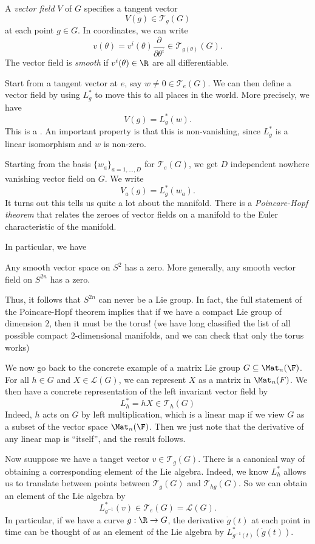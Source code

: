 \documentclass[a4paper]{article}
\begin{document}
\begin{defi}
  A \emph{vector field} $V$ of $G$ specifies a tangent vector
  \[
    V(g) \in \mathcal{T}_g(G)
  \]
  at each point $g \in G$. In coordinates, we can write
  \[
    v(\theta) = v^i (\theta) \frac{\partial}{\partial \theta^i} \in \mathcal{T}_{g(\theta)} (G).
  \]
  The vector field is \emph{smooth} if $v^i(\theta) \in \R$ are all differentiable.
\end{defi}

Start from a tangent vector at $e$, say $w\not= 0 \in \mathcal{T}_e(G)$. We can then define a vector field by using $L_g^*$ to move this to all places in the world. More precisely, we have
\[
  V(g) = L_g^*(w).
\]
This is a . An important property is that this is non-vanishing, since $L_g^*$ is a linear isomorphism and $w$ is non-zero.

Starting from the basis $\{w_a\}_{a = 1, \ldots, D}$ for $\mathcal{T}_e(G)$, we get $D$ independent nowhere vanishing vector field on $G$. We write
\[
  V_a(g) = L_g^* (w_a).
\]
It turns out this tells us quite a lot about the manifold. There is a \emph{Poincare-Hopf theorem} that relates the zeroes of vector fields on a manifold to the Euler characteristic of the manifold.

In particular, we have
\begin{thm}
  Any smooth vector space on $S^2$ has a zero. More generally, any smooth vector field on $S^{2n}$ has a zero.
\end{thm}
Thus, it follows that $S^{2n}$ can never be a Lie group. In fact, the full statement of the Poincare-Hopf theorem implies that if we have a compact Lie group of dimension $2$, then it must be the torus! (we have long classified the list of all possible compact 2-dimensional manifolds, and we can check that only the torus works)

We now go back to the concrete example of a matrix Lie group $G \subseteq \Mat_n(\F)$. For all $h \in G$ and $X \in \mathcal{L} (G)$, we can represent $X$ as a matrix in $\Mat_n(F)$. We then have a concrete representation of the left invariant vector field by
\[
  L_h^* = hX \in \mathcal{T}_h(G)
\]
Indeed, $h$ acts on $G$ by left multiplication, which is a linear map if we view $G$ as a subset of the vector space $\Mat_n(\F)$. Then we just note that the derivative of any linear map is ``itself'', and the result follows.

Now suuppose we have a tanget vector $v \in \mathcal{T}_g(G)$. There is a canonical way of obtaining a corresponding element of the Lie algebra. Indeed, we know $L_h^*$ allows us to translate between points between $\mathcal{T}_g(G)$ and $\mathcal{T}_{hg}(G)$. So we can obtain an element of the Lie algebra by
\[
  L_{g^{-1}}^* (v) \in \mathcal{T}_e(G) = \mathcal{L}(G).
\]
In particular, if we have a curve $g: \R \to G$, the derivative $\dot{g}(t)$ at each point in time can be thought of as an element of the Lie algebra by $L_{g^{-1}(t)}^*(\dot{g}(t))$.
\end{document}
